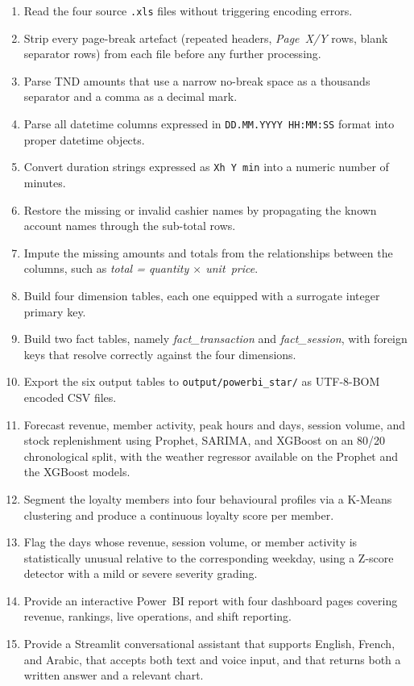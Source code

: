 \documentclass[12pt, a4paper]{report}
\begin{document}
\begin{enumerate}
  \item Read the four source \texttt{.xls} files without triggering
        encoding errors.
  \item Strip every page-break artefact (repeated headers,
        \textit{Page~X/Y} rows, blank separator rows) from each file
        before any further processing.
  \item Parse TND amounts that use a narrow no-break space as a thousands
        separator and a comma as a decimal mark.
  \item Parse all datetime columns expressed in
        \texttt{DD.MM.YYYY~HH:MM:SS} format into proper datetime objects.
  \item Convert duration strings expressed as \texttt{Xh~Y~min} into a
        numeric number of minutes.
  \item Restore the missing or invalid cashier names by propagating the
        known account names through the sub-total rows.
  \item Impute the missing amounts and totals from the relationships
        between the columns, such as
        \textit{total = quantity $\times$ unit~price}.
  \item Build four dimension tables, each one equipped with a surrogate
        integer primary key.
  \item Build two fact tables, namely \textit{fact\_transaction} and
        \textit{fact\_session}, with foreign keys that resolve correctly
        against the four dimensions.
  \item Export the six output tables to \texttt{output/powerbi\_star/} as
        UTF-8-BOM encoded CSV files.
  \item Forecast revenue, member activity, peak hours and days, session
        volume, and stock replenishment using Prophet, SARIMA, and
        XGBoost on an 80/20 chronological split, with the weather
        regressor available on the Prophet and the XGBoost models.
  \item Segment the loyalty members into four behavioural profiles via a
        K-Means clustering and produce a continuous loyalty score per
        member.
  \item Flag the days whose revenue, session volume, or member activity is
        statistically unusual relative to the corresponding weekday,
        using a Z-score detector with a mild or severe severity grading.
  \item Provide an interactive Power~BI report with four dashboard pages
        covering revenue, rankings, live operations, and shift reporting.
  \item Provide a Streamlit conversational assistant that supports
        English, French, and Arabic, that accepts both text and voice
        input, and that returns both a written answer and a relevant
        chart.
\end{enumerate}
\end{document}
